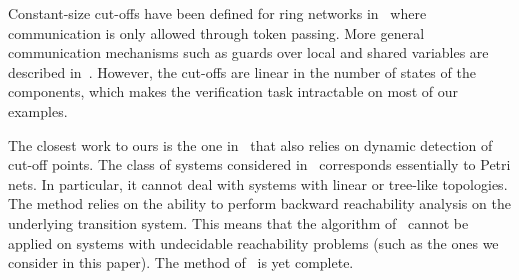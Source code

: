 Constant-size cut-offs have been defined for ring networks
in~\cite{Emerson:Namjoshi:POPL95} where communication is only allowed
through token passing.
%
More general communication mechanisms such as guards over local and shared
variables are described in~\cite{EmKa:manyfew}.
%
However, the cut-offs are linear in the number of states of the
components, which makes the verification task intractable on most of our
examples.

The closest work to ours is the one in~\cite{cutoff} that also relies
on dynamic detection of cut-off points.
%
The class of systems considered in~\cite{cutoff} corresponds
essentially to Petri nets.
%
In particular, it cannot deal with systems with linear or tree-like
topologies.
%
The method relies on the ability to perform backward reachability
analysis on the underlying transition system.
%
This means that the algorithm of~\cite{cutoff} cannot be applied on systems with undecidable reachability problems (such as the ones
we consider in this paper).
%
The method of~\cite{cutoff} is yet complete.
%

